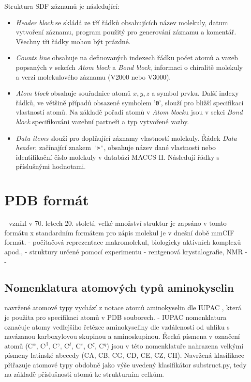 Struktura SDF záznamů je následující:
\begin{itemize}
    \item \textit{Header block} se skládá ze tří řádků obsahujících název molekuly, datum vytvoření záznamu, program použitý pro generování záznamu a komentář. 
    Všechny tři řádky mohou být prázdné.
    \item \textit{Counts line} obsahuje na definovaných indexech řádku počet atomů a vazeb  popsaných v sekcích \textit{Atom block} a \textit{Bond block}, informaci o chiralitě molekuly a verzi molekulového záznamu (V2000 nebo V3000).
    \item \textit{Atom block} obsahuje souřadnice atomů  $x, y, z$ a symbol prvku. Další indexy řád\-ků, ve většině případů obsazené symbolem '\verb|0|', slouží pro bližší specifikaci vlastností atomů. Na základě pořadí atomů v \textit{Atom block}u jsou v sekci \textit{Bond block} specifikováni vazební partneři a typ vytvořené vazby. 
    \item \textit{Data items} slouží pro doplňující záznamy vlastností molekuly. Řádek \textit{Data header}, začínající znakem \verb|'>'|, obsahuje název dané vlastnosti nebo identifikační číslo molekuly v databázi MACCS-II. Následují řádky s příslušnými hodnotami.
\end{itemize}

\section{PDB formát}
- vznikl v 70. letech 20. století, velké množství struktur je zapsáno v tomto formátu x standardním formátem pro zápis molekul je v dnešní době mmCIF formát.
- počítačová reprezentace makromolekul, biologicky aktivních  komplexů apod., 
- struktury určené pomocí experimentu - rentgenová krystalografie, NMR
- 
- 
\subsection{Nomenklatura atomových typů aminokyselin}
navržené atomové typy vychází z notace atomů aminokyselin dle IUPAC \cite{AA_nomenclature}, která je použita pro specifikaci atomů v PDB souborech. 
- IUPAC nomenklatura označuje atomy vedlejšího řetězce aminokyseliny dle vzdálenosti od uhlíku s navázanou karboxylovou skupinou a aminoskupinou. Řecká písmena v označení atomů (C$^\alpha$, C$^\beta$, C$^\gamma$, C$^\delta$, C$^\varepsilon$, C$^\zeta$, C$^\eta$) jsou v této nomenklatuře nahrazena velkými písmeny latinské abecedy (CA, CB, CG, CD, CE, CZ, CH). Navržená klasifikace přiřazuje atomové typy obdobně jako výše uvedený klasifikátor substruct.py, tedy na základě příslušnosti atomů ke strukturním celkům.
